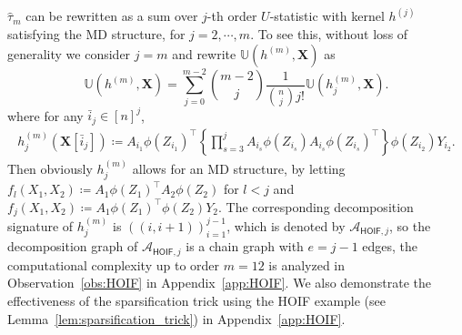 \documentclass[12pt]{article}
\newcommand{\libref}[2]{\href{#2}{\texttt{#1}}}
\theoremstyle{plain}
\theoremstyle{definition}
\newcommand{\ustat}{\mathbb{U}}
\newcommand{\ustatp}[2]{\ustat(#1,#2)}
\newcommand{\less}{O}
\newcommand{\opteinsum}{\libref{opt-einsum}{https://dgasmith.github.io/opt_einsum/}}
\def\calA{\mathcal{A}}
\begin{document}
\begin{bibunit}[agsm]
$\hat{\tau}_{m}$ can be rewritten as a sum over $j$-th order $U$-statistic with kernel $h^{(j)}$ satisfying the MD structure, for $j = 2, \cdots, m$. To see this, without loss of generality we consider $j = m$ and rewrite $\ustat (h^{(m)}, \bm{X})$ as
\begin{equation*}
\ustatp{h^{(m)}}{\bm{X}} = \sum_{j=0}^{m-2} \binom{m-2}{j} \frac{1}{\binom{n}{j} j!}  \ustatp{h_j^{(m)}}{\bm{X}}.
\end{equation*}
where for any $\bar{i}_{j} \in [n]^j$, 
\begin{align} 
\label{eq:hoif_kernel}
h_j^{(m)} (\bm{X}[\bar{i}_{j}]) \coloneqq A_{i_1} \phi (Z_{i_1})^{\top} \left\{ \prod_{s = 3}^{j} A_{i_s} \phi (Z_{i_s}) A_{i_s} \phi (Z_{i_s})^{\top} \right\} \phi (Z_{i_2}) Y_{i_2}.
\end{align}
Then obviously $h_j^{(m)}$ allows for an MD structure, by letting $f_{l} (X_1, X_2) \coloneqq A_1 \phi (Z_1)^{\top} A_2 \phi (Z_2)$ for $l < j$ and $f_{j} (X_1, X_2) \coloneqq A_1 \phi (Z_1)^{\top} \phi (Z_2) Y_2 $. The corresponding decomposition signature of $h_j^{(m)}$ is $((i, i+1))_{i=1}^{j-1}$, which is denoted by $\calA_{\mathsf{HOIF},j}$, so the decomposition graph of $\calA_{\mathsf{HOIF},j}$ is a chain graph with $e = j - 1$ edges, the computational complexity up to order $m=12$ is analyzed in Observation~\ref{obs:HOIF} in Appendix~\ref{app:HOIF}. We also demonstrate the effectiveness of the sparsification trick using the HOIF example (see Lemma~\ref{lem:sparsification_trick}) in Appendix~\ref{app:HOIF}.




\end{bibunit}
\end{document}
